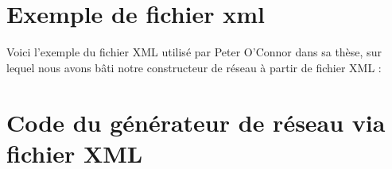 \documentclass[a4paper,10pt]{article}
\begin{document}
\section{Exemple de fichier xml}
\label{xml_exemple}

Voici l'exemple du fichier XML utilisé par Peter O'Connor dans sa thèse, sur lequel nous avons bâti notre constructeur de réseau à partir de fichier XML :
 


\section{Code du générateur de réseau via fichier XML}
\label{xml_builder}

\end{document}

